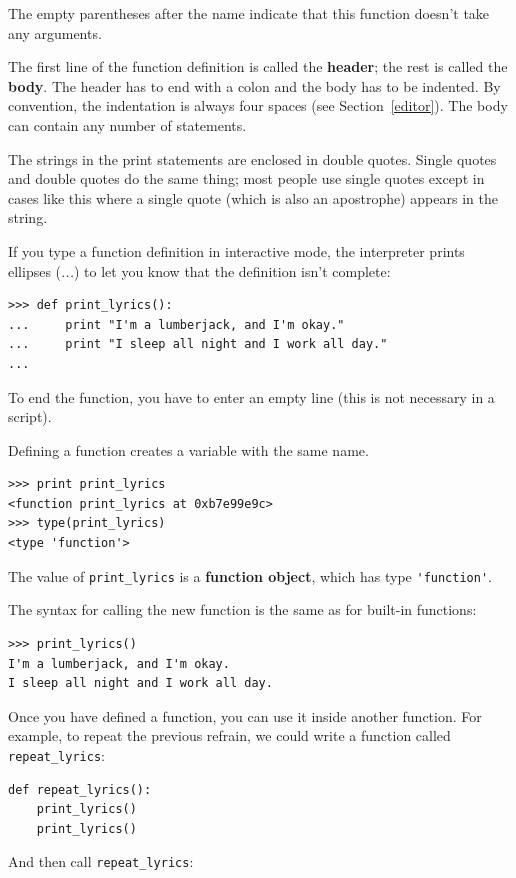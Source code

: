 \documentclass[10pt]{book}
\begin{document}
The empty parentheses after the name indicate that this function
doesn't take any arguments.

The first line of the function definition is called the {\bf header};
the rest is called the {\bf body}.  The header has to end with a colon
and the body has to be indented.  By convention, the indentation is
always four spaces (see Section~\ref{editor}).  The body can contain
any number of statements.

The strings in the print statements are enclosed in double
quotes.  Single quotes and double quotes do the same thing;
most people use single quotes except in cases like this where
a single quote (which is also an apostrophe) appears in the string.

If you type a function definition in interactive mode, the interpreter
prints ellipses ({\em ...}) to let you know that the definition
isn't complete:

\begin{verbatim}
>>> def print_lyrics():
...     print "I'm a lumberjack, and I'm okay."
...     print "I sleep all night and I work all day."
...
\end{verbatim}
%
To end the function, you have to enter an empty line (this is
not necessary in a script).

Defining a function creates a variable with the same name.

\begin{verbatim}
>>> print print_lyrics
<function print_lyrics at 0xb7e99e9c>
>>> type(print_lyrics)
<type 'function'>
\end{verbatim}
%
The value of \verb"print_lyrics" is a {\bf function object}, which
has type \verb"'function'".

The syntax for calling the new function is the same as
for built-in functions:

\begin{verbatim}
>>> print_lyrics()
I'm a lumberjack, and I'm okay.
I sleep all night and I work all day.
\end{verbatim}
%
Once you have defined a function, you can use it inside another
function.  For example, to repeat the previous refrain, we could write
a function called \verb"repeat_lyrics":

\begin{verbatim}
def repeat_lyrics():
    print_lyrics()
    print_lyrics()
\end{verbatim}
%
And then call \verb"repeat_lyrics":
\end{document}

